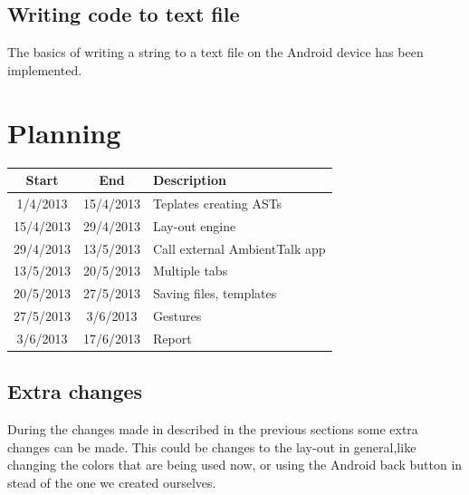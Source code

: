 \documentclass[a4paper,12pt]{report}
\begin{document}
\subsection{Writing code to text file}
The basics of writing a string to a text file on the Android device has been implemented.

\section{Planning}
\begin{tabular}{|c|c|l|}
\hline
\textbf{Start} & \textbf{End} & \textbf{Description} \\
\hline
1/4/2013 & 15/4/2013 & Teplates creating ASTs \\
15/4/2013 & 29/4/2013 & Lay-out engine \\
29/4/2013 & 13/5/2013 & Call external AmbientTalk app \\
13/5/2013 & 20/5/2013 & Multiple tabs \\
20/5/2013 & 27/5/2013 & Saving files, templates \\
27/5/2013 & 3/6/2013 & Gestures \\
3/6/2013 & 17/6/2013 & Report \\
\hline
\end{tabular}

\subsection{Extra changes}
During the changes made in described in the previous sections some extra changes can be made. This could be changes to the lay-out in general,like changing the colors that are being used now, or using the Android 
back button in stead of the one we created ourselves.
\end{document}
